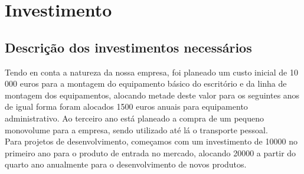 \documentclass[a4paper]{article}
\begin{document}
\section{Investimento}
\subsection{Descrição dos investimentos necessários}
Tendo en conta a natureza da nossa empresa, foi planeado um custo inicial de 10 000 euros para a montagem do equipamento básico do escritório e da linha de montagem dos equipamentos, alocando metade deste valor para os seguintes anos de igual forma foram alocados 1500 euros anuais para equipamento administrativo. Ao terceiro ano está planeado a compra de um pequeno monovolume para a empresa, sendo utilizado até lá o transporte pessoal. \\ Para projetos de desenvolvimento, começamos com um investimento de 10000 no primeiro ano para o produto de entrada no mercado, alocando 20000 a partir do quarto ano anualmente para o desenvolvimento de novos produtos.
\end{document}
